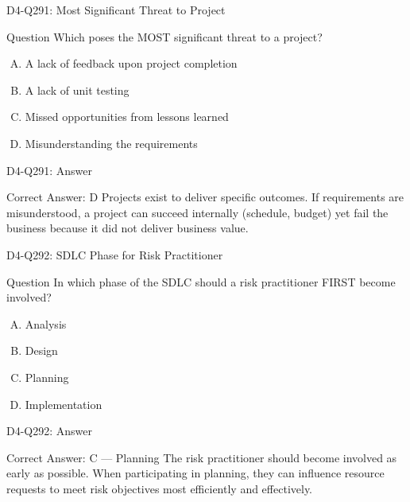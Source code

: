 \documentclass{beamer}
\begin{document}
	\begin{frame}{D4-Q291: Most Significant Threat to Project}
		\begin{block}{Question}
			Which poses the MOST significant threat to a project?
		\end{block}
		\begin{enumerate}[(A)]
			\item A lack of feedback upon project completion
			\item A lack of unit testing
			\item Missed opportunities from lessons learned
			\item Misunderstanding the requirements
		\end{enumerate}
	\end{frame}
	\begin{frame}{D4-Q291: Answer}
		\begin{block}{Correct Answer: D}
			Projects exist to deliver specific outcomes. If requirements are misunderstood, a project can succeed internally (schedule, budget) yet fail the business because it did not deliver business value.
		\end{block}
	\end{frame}
	
	\begin{frame}{D4-Q292: SDLC Phase for Risk Practitioner}
		\begin{block}{Question}
			In which phase of the SDLC should a risk practitioner FIRST become involved?
		\end{block}
		\begin{enumerate}[(A)]
			\item Analysis
			\item Design
			\item Planning
			\item Implementation
		\end{enumerate}
	\end{frame}
	\begin{frame}{D4-Q292: Answer}
		\begin{block}{Correct Answer: C --- Planning}
			The risk practitioner should become involved as early as possible. When participating in planning, they can influence resource requests to meet risk objectives most efficiently and effectively.
		\end{block}
	\end{frame}
	
\end{document}
